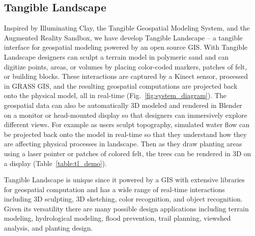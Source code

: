 \documentclass[Afour,sagev,times]{sagej} %
\begin{document}
\subsection{Tangible Landscape}
Inspired by Illuminating Clay, 
the Tangible Geospatial Modeling System, 
\cite{Mitasova2006,Tateosian2010} 
and the Augmented Reality Sandbox, 
we have develop Tangible Landscape 
-- a tangible interface for geospatial modeling
powered by an open source GIS. \cite{Petrasova2015}
With Tangible Landscape
designers can sculpt a terrain model in polymeric sand
and can digitize points, areas, or volumes by placing 
color-coded markers, patches of felt, or building blocks. 
These interactions are captured by a Kinect sensor, 
processed in GRASS GIS, 
and the resulting geospatial computations
are projected back onto the physical model, 
all in real-time (Fig.~\ref{fig:system_diagram}).
The geospatial data can also be automatically
3D modeled and rendered in Blender 
on a monitor or head-mounted display
so that designers can 
immersively explore different views. \cite{Tabrizian2016}
For example
as users sculpt topography,
simulated water flow can be projected back onto the model in real-time
so that they understand how they are affecting 
physical processes in landscape.
Then as they draw planting areas 
using a laser pointer or patches of colored felt,
the trees can be rendered in 3D on a display %
(Table~\ref{table:tl_demo}). 

Tangible Landscape is unique since it powered by a GIS
with extensive libraries for geospatial computation
and has a wide range of real-time interactions including 
3D sculpting, 3D sketching, color recognition, and object recognition.
Given its versatility there are many possible design applications
including terrain modeling, hydrological modeling, flood prevention,
trail planning, viewshed analysis, and planting design. 
\end{document}
